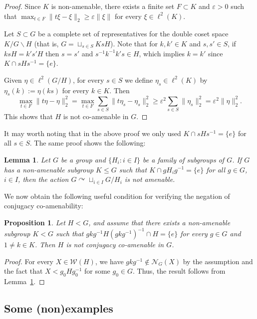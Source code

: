 \documentclass[11pt]{amsart}
\newtheorem{prop}[thm]{Proposition}
\newtheorem{lem}[thm]{Lemma}
\theoremstyle{definition}
\newcommand{\eps}{\varepsilon}
\newcommand{\act}{\curvearrowright}
\begin{document}
\begin{proof}
Since $K$ is non-amenable, there exists a finite set $F\subset K$ and $\eps>0$ such that $\max_{t\in F} \|t\xi - \xi\|_2 \ge \eps\|\xi\|$ for every $\xi\in\ell^2(K)$. 

Let $S\subset G$ be a complete set of representatives for the double coset space $K/G\backslash H$ (that is, $G = \sqcup_{s\in S} KsH$). Note that for $k, k'\in K$ and $s, s'\in S$, if $ksH = k's'H$ then $s=s'$ and $s^{-1}k^{-1}k's\in H$, which implies $k=k'$ since $K\cap sHs^{-1} = \{e\}$.

Given $\eta\in\ell^2(G/H)$, for every $s\in S$ we define $\eta_s\in\ell^2(K)$ by $\eta_s(k):= \eta(ks)$ for every $k\in K$. 
 Then
\[
\max_{t\in F} \|t\eta - \eta\|_2^2 = \max_{t\in F} \sum_{s\in S}\|t\eta_s - \eta_s\|_2^2 \ge \eps^2\sum_{s\in S}\|\eta_s\|_2^2 =\eps^2\|\eta\|_2^2 .
\]
This shows that $H$ is not co-amenable in $G$.
\end{proof}
It may worth noting that in the above proof we only used $K\cap sHs^{-1} = \{e\}$ for all $s\in S$. The same proof shows the following: 

\begin{lem}\label{lem:ncca}
Let $G$ be a group and $\{H_i :i\in I\}$ be a family of subgroups of $G$. If $G$ has a non-amenable subgroup $K\le G$ such that $K\cap gH_ig^{-1} = \{e\}$ for all $g\in G$, $i\in I$, then the action $G\act \sqcup_{i\in I} G/H_i$ is not amenable.
\end{lem}

We now obtain the following useful condition for verifying the negation of conjugacy co-amenability: 

\begin{prop}\label{useful negatation}
Let $H<G$, and assume that there exists a non-amenable subgroup $K<G$ such that $gkg^{-1} H (gkg^{-1})^{-1}\cap H= \{e\}$ for every $g\in G$ and $1\neq k\in K$. Then $H$ is not conjugacy co-amenable in $G$.
\end{prop}
\begin{proof}
For every $X\in \mathcal{W}(H)$, we have $gkg^{-1}\notin \mathcal{N}_G(X)$ by the assumption and the fact that $X<g_0Hg_0^{-1}$  for some $g_0\in G$. Thus, the result follows from Lemma~\ref{lem:ncca}.  
\end{proof}






\subsection{Some (non)examples}\label{non examples section}
\end{document}

